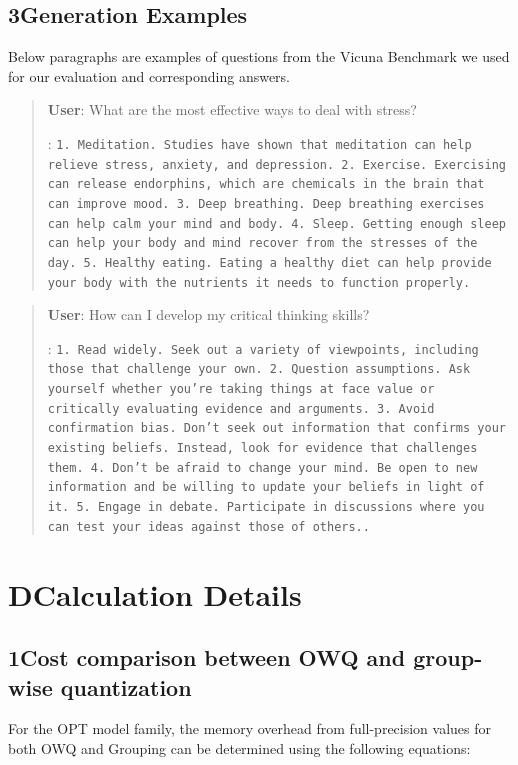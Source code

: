 \documentclass[letterpaper]{article} %
\begin{document}
\subsection*{3\quad Generation Examples}

Below paragraphs are examples of questions from the Vicuna Benchmark \cite{vicuna2023} we used for our evaluation and corresponding answers.


\begin{quote}
\textbf{User}: What are the most effective ways to deal with stress?

: \texttt{1. Meditation. Studies have shown that meditation can help relieve stress, anxiety, and depression.
2. Exercise. Exercising can release endorphins, which are chemicals in the brain that can improve mood.
3. Deep breathing. Deep breathing exercises can help calm your mind and body.
4. Sleep. Getting enough sleep can help your body and mind recover from the stresses of the day.
5. Healthy eating. Eating a healthy diet can help provide your body with the nutrients it needs to function properly.}
\end{quote}

\begin{quote}
\textbf{User}: How can I develop my critical thinking skills?

: \texttt{1. Read widely. Seek out a variety of viewpoints, including those that challenge your own.
2. Question assumptions. Ask yourself whether you're taking things at face value or critically evaluating evidence and arguments.
3. Avoid confirmation bias. Don't seek out information that confirms your existing beliefs. Instead, look for evidence that challenges them.
4. Don't be afraid to change your mind. Be open to new information and be willing to update your beliefs in light of it.
5. Engage in debate. Participate in discussions where you can test your ideas against those of others..}
\end{quote}


\section*{D\quad Calculation Details}

\subsection*{1\quad Cost comparison between OWQ and group-wise quantization}
For the OPT model family, the memory overhead from full-precision values for both OWQ and Grouping can be determined using the following equations:
\end{document}
